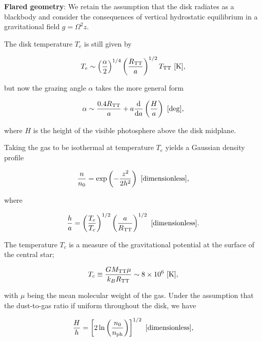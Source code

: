 \documentclass[a4paper,10pt]{article}
\begin{document}
{\noindent}\textbf{Flared geometry}: We retain the assumption that the disk radiates as a blackbody and consider the consequences of vertical hydrostatic equilibrium in a gravitational field $g=\Omega^2z$.

{\noindent}The disk temperature $T_e$ is still given by

\begin{align*}
    T_e \sim \left(\frac{\alpha}{2}\right)^{1/4} \left(\frac{R_{\rm TT}}{a}\right)^{1/2} T_{\rm TT} ~ [{\rm K}],
\end{align*}

{\noindent}but now the grazing angle $\alpha$ takes the more general form

\begin{align*}
    \alpha \sim \frac{0.4R_{\rm TT}}{a} + a\frac{{\rm d}}{{\rm d}a} \left(\frac{H}{a}\right) ~ [{\rm deg}],
\end{align*}

{\noindent}where $H$ is the height of the visible photosphere above the disk midplane.

{\noindent}Taking the gas to be isothermal at temperature $T_e$ yields a Gaussian density profile

\begin{align*}
    \frac{n}{n_0} = \exp \left(-\frac{z^2}{2h^2}\right) ~ [{\rm dimensionless}],
\end{align*}

{\noindent}where

\begin{align*}
    \frac{h}{a} = \left(\frac{T_e}{T_c}\right)^{1/2} \left(\frac{a}{R_{\rm TT}}\right)^{1/2} ~ [{\rm dimensionless}].
\end{align*}

{\noindent}The temperature $T_c$ is a measure of the gravitational potential at the surface of the central star;

\begin{align*}
    T_c \equiv \frac{GM_{\rm TT}\mu}{k_BR_{\rm TT}} \sim 8\times10^6 ~ [{\rm K}],
\end{align*}

{\noindent}with $\mu$ being the mean molecular weight of the gas. Under the assumption that the dust-to-gas ratio if uniform throughout the disk, we have

\begin{align*}
    \frac{H}{h} = \left[2\ln\left(\frac{n_0}{n_{\rm ph}}\right)\right]^{1/2} ~ [{\rm dimensionless}],
\end{align*}
\end{document}
